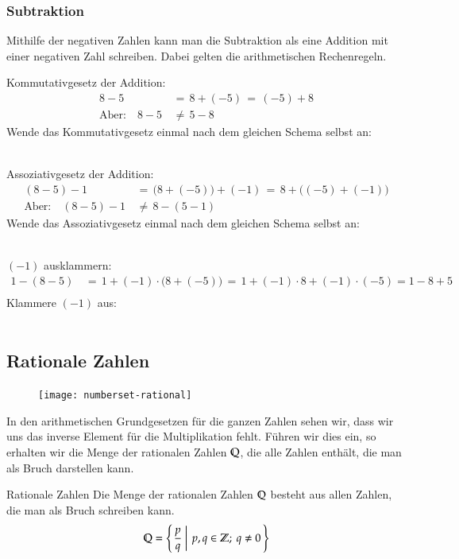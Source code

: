 \subsubsection{Subtraktion}
Mithilfe der negativen Zahlen kann man die Subtraktion als eine Addition mit einer negativen Zahl schreiben. Dabei gelten die arithmetischen Rechenregeln.
\begin{example} Kommutativgesetz der Addition:
	\begin{align*}
					8 - 5		&\,=\, 8 + (-5) \,=\, (-5) + 8\\
		\text{Aber:}\quad 8 - 5		&\,\neq\, 5 - 8
	\end{align*}
	Wende das Kommutativgesetz einmal nach dem gleichen Schema selbst an:\\
	\\
\end{example}
\begin{example} Assoziativgesetz der Addition:
	\begin{align*}
					(8 - 5) - 1			&\,=\, \bigl(8 + (-5)\bigr) + (-1) \,=\, 8 + \bigl( (-5) + (-1)\bigr)\\
		\text{Aber:}\quad (8 - 5) - 1	&\,\neq\, 8 - (5 - 1)
	\end{align*}
	Wende das Assoziativgesetz einmal nach dem gleichen Schema selbst an:\\
	\\
\end{example}
\begin{example} $(-1)$ ausklammern:
	\begin{align*}
					1 -(8 - 5)			&\,=\, 1 + (-1)\cdot\bigl(8 + (-5)\bigr)\,=\, 1 + (-1)\cdot 8 + (-1)\cdot (-5) = 1 - 8 + 5\\
	\end{align*}
	Klammere $(-1)$ aus:\\
	\\
\end{example}

\subsection{Rationale Zahlen}
\begin{figure}
	\vspace{-2cm}
	\texttt{[image: numberset-rational]}
	\vspace{-2cm}
\end{figure}
In den arithmetischen Grundgesetzen für die ganzen Zahlen sehen wir, dass wir uns das inverse Element für die Multiplikation fehlt.
Führen wir dies ein, so erhalten wir die Menge der rationalen Zahlen $\mathbb{Q}$, die alle Zahlen enthält, die man als Bruch darstellen kann. 
\newpage
\begin{defn}{Rationale Zahlen}
	Die Menge der rationalen Zahlen $\mathbb{Q}$ besteht aus allen Zahlen, die man als Bruch schreiben kann.
	\begin{align*}
		\mathbb{Q} = \left\{\left. \frac{p}{q} ~\right|~ p,q \in \mathbb{Z};~ q \neq 0\, \right\}
	\end{align*}
\end{defn}

